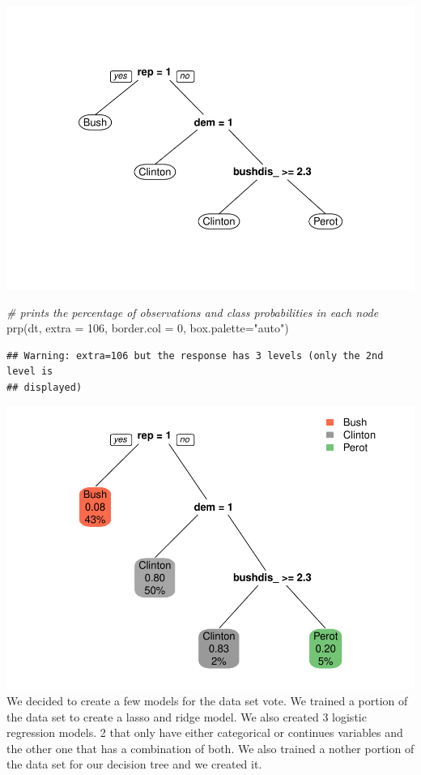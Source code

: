 \documentclass[
]{article}
\newenvironment{Shaded}{\begin{snugshade}}{\end{snugshade}}
\newcommand{\AttributeTok}[1]{\textcolor[rgb]{0.77,0.63,0.00}{#1}}
\newcommand{\CommentTok}[1]{\textcolor[rgb]{0.56,0.35,0.01}{\textit{#1}}}
\newcommand{\DecValTok}[1]{\textcolor[rgb]{0.00,0.00,0.81}{#1}}
\newcommand{\FunctionTok}[1]{\textcolor[rgb]{0.00,0.00,0.00}{#1}}
\newcommand{\NormalTok}[1]{#1}
\newcommand{\StringTok}[1]{\textcolor[rgb]{0.31,0.60,0.02}{#1}}
\begin{document}
\includegraphics{1992-US-election_files/figure-latex/unnamed-chunk-14-1.pdf}

\begin{Shaded}
\begin{Highlighting}[]
\CommentTok{\# prints the percentage of observations and class probabilities in each node}
\FunctionTok{prp}\NormalTok{(dt, }\AttributeTok{extra =} \DecValTok{106}\NormalTok{, }\AttributeTok{border.col =} \DecValTok{0}\NormalTok{, }\AttributeTok{box.palette=}\StringTok{"auto"}\NormalTok{) }
\end{Highlighting}
\end{Shaded}

\begin{verbatim}
## Warning: extra=106 but the response has 3 levels (only the 2nd level is
## displayed)
\end{verbatim}

\includegraphics{1992-US-election_files/figure-latex/unnamed-chunk-14-2.pdf}
We decided to create a few models for the data set vote. We trained a
portion of the data set to create a lasso and ridge model. We also
created 3 logistic regression models. 2 that only have either
categorical or continues variables and the other one that has a
combination of both. We also trained a nother portion of the data set
for our decision tree and we created it.
\end{document}
